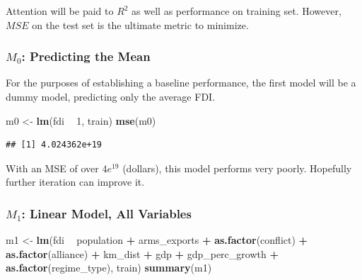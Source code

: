 \documentclass[11pt,]{article}
\newenvironment{Shaded}{\begin{snugshade}}{\end{snugshade}}
\newcommand{\DecValTok}[1]{\textcolor[rgb]{0.00,0.00,0.81}{#1}}
\newcommand{\KeywordTok}[1]{\textcolor[rgb]{0.13,0.29,0.53}{\textbf{#1}}}
\newcommand{\NormalTok}[1]{#1}
\newcommand{\OperatorTok}[1]{\textcolor[rgb]{0.81,0.36,0.00}{\textbf{#1}}}
\newcommand{\StringTok}[1]{\textcolor[rgb]{0.31,0.60,0.02}{#1}}
\begin{document}
Attention will be paid to \(R^2\) as well as performance on training
set. However, \(MSE\) on the test set is the ultimate metric to
minimize.

\hypertarget{m_0-predicting-the-mean}{%
\subsubsection{\texorpdfstring{\(M_0\): Predicting the
Mean}{M\_0: Predicting the Mean}}\label{m_0-predicting-the-mean}}

For the purposes of establishing a baseline performance, the first model
will be a dummy model, predicting only the average FDI.

\begin{Shaded}
\begin{Highlighting}[]
\NormalTok{m0 <-}\StringTok{ }\KeywordTok{lm}\NormalTok{(fdi }\OperatorTok{~}\StringTok{ }\DecValTok{1}\NormalTok{, train)}
\KeywordTok{mse}\NormalTok{(m0)}
\end{Highlighting}
\end{Shaded}

\begin{verbatim}
## [1] 4.024362e+19
\end{verbatim}

With an MSE of over \(4e^{19}\) (dollars), this model performs very
poorly. Hopefully further iteration can improve it.

\hypertarget{m_1-linear-model-all-variables}{%
\subsubsection{\texorpdfstring{\(M_1\): Linear Model, All
Variables}{M\_1: Linear Model, All Variables}}\label{m_1-linear-model-all-variables}}

\begin{Shaded}
\begin{Highlighting}[]
\NormalTok{m1 <-}\StringTok{ }\KeywordTok{lm}\NormalTok{(fdi }\OperatorTok{~}\StringTok{ }\NormalTok{population }\OperatorTok{+}\StringTok{ }\NormalTok{arms_exports }\OperatorTok{+}\StringTok{ }\KeywordTok{as.factor}\NormalTok{(conflict) }\OperatorTok{+}\StringTok{ }
\StringTok{               }\KeywordTok{as.factor}\NormalTok{(alliance) }\OperatorTok{+}\StringTok{ }\NormalTok{km_dist }\OperatorTok{+}\StringTok{ }\NormalTok{gdp }\OperatorTok{+}\StringTok{ }\NormalTok{gdp_perc_growth }\OperatorTok{+}
\StringTok{               }\KeywordTok{as.factor}\NormalTok{(regime_type), train)}
\KeywordTok{summary}\NormalTok{(m1)}
\end{Highlighting}
\end{Shaded}
\end{document}
